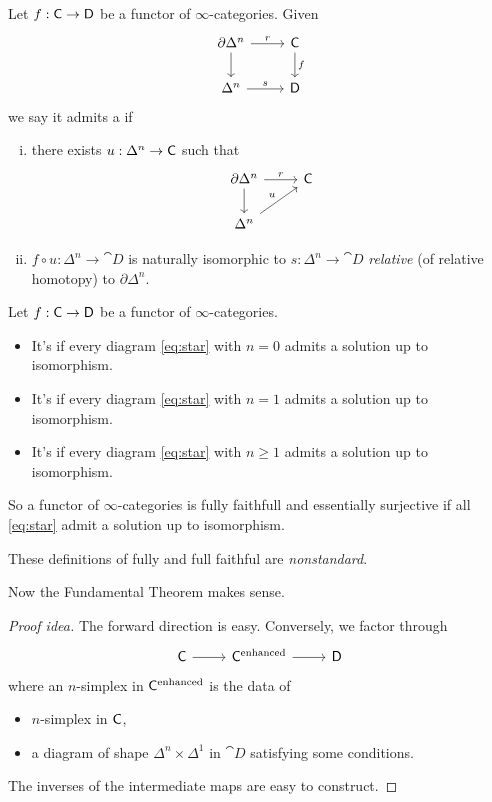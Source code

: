 \begin{definition}
Let $f:\C\to \cat{D}$ be a functor of $\infty$-categories. Given
\begin{equation}\label{eq:star}
	\begin{tikzcd}
		\partial \Delta^{n} \ar[r,"r"] \ar[d] & \C \ar[d,"f"] \\
		\Delta^{n} \ar[r,"s"] & \cat{D}
	\end{tikzcd}
\end{equation}
we say it admits a  if
\begin{enumerate}[(i)]
	\item there exists $u:\Delta^{n}\to \C$ such that
		\[
			\begin{tikzcd}
				\partial \Delta^{n} \ar[r,"r"] \ar[d] & \C \\
				\Delta^{n} \ar[ur,"u"]
			\end{tikzcd}
		\]
	\item $f\circ u:\Delta^{n}\to \cat{D}$ is naturally isomorphic to $s:\Delta^{n}\to
		\cat{D}$ \emph{relative} (of relative homotopy) to $\partial \Delta^{n}$.
\end{enumerate}
\end{definition}
\begin{definition}
Let $f:\C\to \cat{D}$ be a functor of $\infty$-categories.
\begin{itemize}
	\item It's  if every diagram \eqref{eq:star} with $n=0$
		admits a solution up to isomorphism.
	\item It's  if every diagram \eqref{eq:star} with $n=1$ admits a solution up
		to isomorphism.
	\item It's  if every diagram \eqref{eq:star} with $n\ge 1$ admits a
		solution up to isomorphism.
\end{itemize}
\end{definition}
So a functor of $\infty$-categories is fully faithfull and essentially surjective if all
\eqref{eq:star} admit a solution up to isomorphism.
\begin{remark}
These definitions of fully and full faithful are \emph{nonstandard}.
\end{remark}
Now the Fundamental Theorem makes sense.
\begin{proof}[Proof idea]
The forward direction is easy. Conversely, we factor through
\[
	\begin{tikzcd}
		\C \ar[r] & \C^{\text{enhanced}} \ar[r] & \cat{D}
	\end{tikzcd}
\]
where an $n$-simplex in $\mathsf{C}^{\text{enhanced}}$ is the data of
\begin{itemize}
	\item $n$-simplex in $\mathsf{C}$,
	\item a diagram of shape $\Delta^{n}\times \Delta^{1}$ in $\cat{D}$ satisfying some conditions.
\end{itemize}
The inverses of the intermediate maps are easy to construct.
\end{proof}
